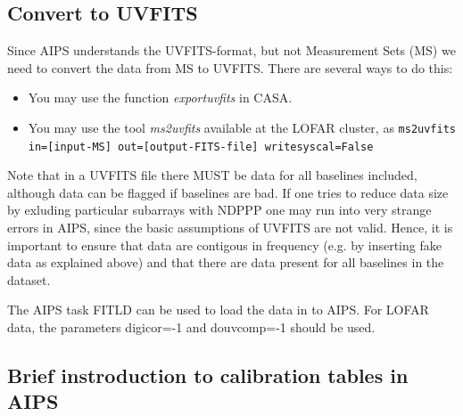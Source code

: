 \documentclass[graybox]{svmult}
\begin{document}


\subsection{Convert to UVFITS}

Since AIPS understands the UVFITS-format, but not Measurement Sets (MS)
we need to convert the data from MS to UVFITS. There are several ways to do this:
\begin{itemize}
\item You may use the function \emph{exportuvfits} in CASA.
\item You may use the tool \emph{ms2uvfits} available at the LOFAR cluster, as {\tt ms2uvfits in=[input-MS] out=[output-FITS-file] writesyscal=False}
\end{itemize}
Note that in a UVFITS file there MUST be data for all baselines included, although
data can be flagged if baselines are bad. If one tries to reduce data size by exluding particular subarrays
with NDPPP one may run into very strange errors in AIPS, since the basic assumptions of UVFITS are not valid.
Hence, it is important to ensure that data are contigous in frequency (e.g. by inserting fake data as explained above)
and that there are data present for all baselines in the dataset. 

The AIPS task FITLD can be used to load the data in to AIPS. For LOFAR data,
the parameters digicor=-1 and douvcomp=-1 should be used.


\subsection{Brief instroduction to calibration tables in AIPS}\label{sec:aips}
\end{document}
